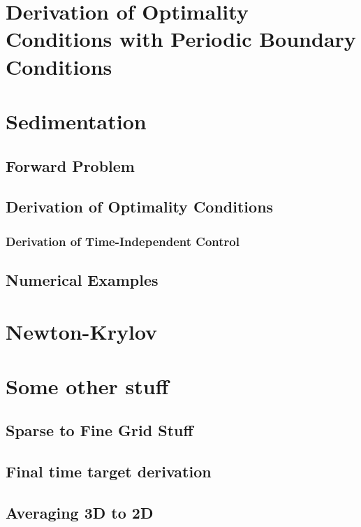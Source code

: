 \documentclass[11pt, a4paper]{article}
\theoremstyle{definition}
\begin{document}
	\section{Derivation of Optimality Conditions with Periodic Boundary Conditions}
	
	\section{Sedimentation}
	\subsection{Forward Problem}
	
	\subsection{Derivation of Optimality Conditions}
	
	\subsubsection{Derivation of Time-Independent Control}
	
	
	\subsection{Numerical Examples}
	
	
	\section{Newton-Krylov}
	
	
	\section{Some other stuff}
	\subsection{Sparse to Fine Grid Stuff}
	\subsection{Final time target derivation}
	\subsection{Averaging 3D to 2D}
	
	
	
	\pagebreak	
	
	
	
\end{document}
